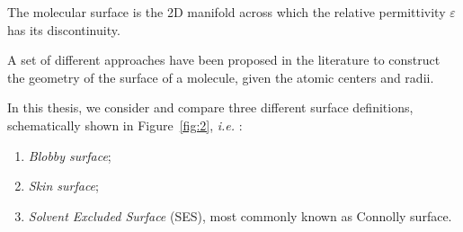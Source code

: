 \documentclass[11pt,a4paper,twocolumn]{article}
\begin{document}

The molecular surface is the 2D manifold across which the 
relative permittivity $\varepsilon$ has its discontinuity.

A set of different approaches have been proposed in the
literature to construct the geometry of the surface of a molecule, given the atomic centers and radii.

In this thesis,  we consider and compare three different surface definitions, 
schematically shown in Figure~\ref{fig:2}, \textit{i.e.} : 
\begin{enumerate}
    \item {\it Blobby surface};
    \item {\it Skin surface};
    \item {\it Solvent Excluded Surface} (SES), most commonly known as Connolly surface.
\end{enumerate}
\end{document}
